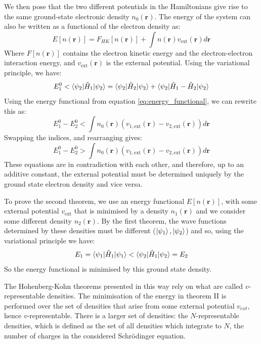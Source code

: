 \documentclass[12pt]{article}
\begin{document}
We then pose that the two different potentials in the Hamiltonians give rise to the same ground-state electronic density $n_0(\mathbf r)$.
The energy of the system can also be written as a functional of the electron density as:
\begin{equation}\label{eq:energy_functional}
E[n(\mathbf r)] = F_{HK}[n(\mathbf r)]+ \int n(\mathbf r)v_{\mathrm{ext}}(\mathbf r)d\mathbf r
\end{equation}
Where $F[n(\mathbf r)]$ contains the electron kinetic energy and the electron-electron interaction energy, and $v_{\mathrm{ext}}(\mathbf r)$ is the external potential.
Using the variational principle, we have:
\begin{equation} 
	E^0_1 < \braket{\psi_2 | \hat H_1 | \psi_2} = \braket{\psi_2 | \hat H_2 | \psi_2} + \braket{\psi_2 |\hat H_1 - \hat H_2 |\psi_2}
\end{equation}
Using the energy functional from equation \ref{eq:energy_functional}, we can rewrite this as:
\begin{equation}\label{eq:contra_1}
E^0_1 - E^0_2 < \int n_0(\mathbf r)(v_{1,\mathrm{ext}}(\mathbf r)-v_{2,\mathrm{ext}}(\mathbf r)) d\mathbf r
\end{equation}
Swapping the indices, and rearranging gives:
\begin{equation}
E^0_1 - E^0_2 > \int n_0(\mathbf r)(v_{1,\mathrm{ext}}(\mathbf r)-v_{2,\mathrm{ext}}(\mathbf r)) d\mathbf r
\end{equation}
These equations are in contradiction with each other, and therefore, up to an additive constant, the external potential must be determined uniquely by the ground state electron density and vice versa.

To prove the second theorem, we use an energy functional $E[n(\mathbf r)]$, with some external potential $v_{\mathrm{ext}}$ that is minimised by a density $n_1(\mathbf r)$ and we consider some different density $n_2(\mathbf r)$. 
By the first theorem, the wave functions determined by these densities must be different ($\ket{\psi_1}, \ket{\psi_2}$) and so, using the variational principle we have:
\begin{equation}\label{eq:hk_2}
E_1 = \braket{\psi_1 | \hat H _1 | \psi_1} < \braket{\psi_2 | \hat H _1 | \psi_2} = E_2
\end{equation}
So the energy functional is minimised by this ground state density.

The Hohenberg-Kohn theorems presented in this way rely on what are called $v$-representable densities. The minimisation of the energy in theorem II is performed over the set of densities that arise from some external potential $v_{ext}$, hence $v$-representable. There is a larger set of densities: the $N$-representable densities, which is defined as the set of all densities which integrate to $N$, the number of charges in the considered Schr\"{o}dinger equation.
\end{document}
